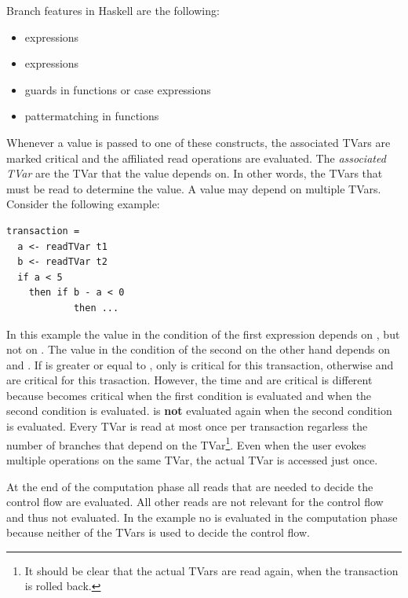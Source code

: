 Branch features in Haskell are the following:
\begin{itemize}
 \item {} expressions
 \item {} expressions
 \item guards in functions or case expressions
 \item pattermatching in functions
\end{itemize}
Whenever a value is passed to one of these constructs, the associated TVars are marked critical
and the affiliated read operations are evaluated. The \textit{associated TVar} are the TVar 
that the value depends on. In other words, the TVars that must be read to determine the value.
A value may depend on multiple TVars. Consider the following example:
\begin{lstlisting}
transaction =
  a <- readTVar t1
  b <- readTVar t2
  if a < 5
    then if b - a < 0 
            then ...
\end{lstlisting}
In this example the value in the condition of the first  expression depends on , but not
on . The value in the condition of the second  on the other hand 
depends on  and . If  is greater or equal to , only  is critical
for this transaction, otherwise  and  are critical for this trasaction. However, the time 
 and  are critical is different because  becomes critical when the first  
condition is evaluated and  when the second  condition is evaluated.  is \textbf{not} 
evaluated again when the second  condition is evaluated. Every TVar is read at most once per 
transaction regarless the number of branches that depend on the TVar\footnote{It should be clear that the
actual TVars are read again, when the transaction is rolled back.}. Even when the user evokes
multiple  operations on the same TVar, the actual TVar is accessed just once. 

At the end of the computation phase all reads that are needed to decide the control flow are evaluated. 
All other reads are not relevant for the control flow and thus not evaluated. 
In the  example no  is evaluated in the computation phase because neither of the 
TVars is used to decide the control flow.

